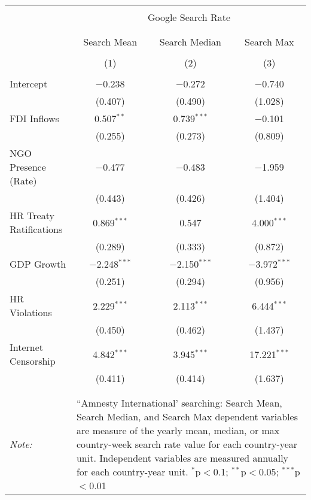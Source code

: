 
\begin{table}[!htbp] \centering 
  \caption{} 
  \label{} 
\begin{tabular}{@{\extracolsep{5pt}}lccc} 
\\[-1.8ex]\hline 
\hline \\[-1.8ex] 
 & \multicolumn{3}{c}{Google Search Rate} \\ 
\cline{2-4} 
\\[-1.8ex] & \multicolumn{3}{c}{ } \\ 
 & Search Mean & Search Median & Search Max \\ 
\\[-1.8ex] & (1) & (2) & (3)\\ 
\hline \\[-1.8ex] 
 Intercept & $-$0.238 & $-$0.272 & $-$0.740 \\ 
  & (0.407) & (0.490) & (1.028) \\ 
  FDI Inflows & 0.507$^{**}$ & 0.739$^{***}$ & $-$0.101 \\ 
  & (0.255) & (0.273) & (0.809) \\ 
  NGO Presence (Rate) & $-$0.477 & $-$0.483 & $-$1.959 \\ 
  & (0.443) & (0.426) & (1.404) \\ 
  HR Treaty Ratifications & 0.869$^{***}$ & 0.547 & 4.000$^{***}$ \\ 
  & (0.289) & (0.333) & (0.872) \\ 
  GDP Growth & $-$2.248$^{***}$ & $-$2.150$^{***}$ & $-$3.972$^{***}$ \\ 
  & (0.251) & (0.294) & (0.956) \\ 
  HR Violations & 2.229$^{***}$ & 2.113$^{***}$ & 6.444$^{***}$ \\ 
  & (0.450) & (0.462) & (1.437) \\ 
  Internet Censorship & 4.842$^{***}$ & 3.945$^{***}$ & 17.221$^{***}$ \\ 
  & (0.411) & (0.414) & (1.637) \\ 
 \hline \\[-1.8ex] 
\hline 
\hline \\[-1.8ex] 
\textit{Note:}  & \multicolumn{3}{l}{\parbox[t]{8cm}{``Amnesty International' searching: Search Mean, Search Median, and Search Max dependent variables are measure of the yearly mean, median, or max country-week search rate value for each country-year unit. Independent variables are measured annually for each country-year unit. $^{*}$p$<$0.1; $^{**}$p$<$0.05; $^{***}$p$<$0.01}} \\ 
\end{tabular} 
\end{table} 
